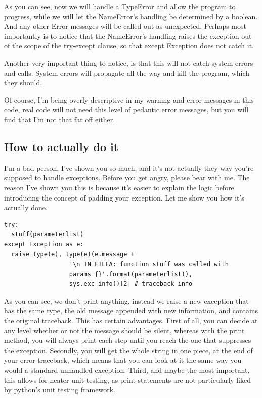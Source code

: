 \documentclass[10pt,a4paper]{article}
\begin{document}
As you can see, now we will handle a TypeError and allow the program to progress, while we will let the NameError's handling be determined by a boolean. And any other Error messages will be called out as unexpected. Perhaps most importantly is to notice that the NameError's handling raises the exception out of the scope of the try-except clause, so that except Exception does not catch it.

Another very important thing to notice, is that this will not catch system errors and calls. System errors will propagate all the way and kill the program, which they should. 

Of course, I'm being overly descriptive in my warning and error messages in this code, real code will not need this level of pedantic error messages, but you will find that I'm not that far off either. 

\subsection{How to actually do it}

I'm a bad person. I've shown you so much, and it's not actually they way you're supposed to handle exceptions. Before you get angry, please bear with me. The reason I've shown you this is because it's easier to explain the logic before introducing the concept of padding your exception. Let me show you how it's actually done.

\begin{lstlisting}
try: 
  stuff(parameterlist)
except Exception as e:
  raise type(e), type(e)(e.message + 
                  '\n IN FILEA: function stuff was called with 
                  params {}'.format(parameterlist)), 
                  sys.exc_info()[2] # traceback info
\end{lstlisting}

As you can see, we don't print anything, instead we raise a new exception that has the same type, the old message appended with new information, and contains the original traceback. This has certain advantages. First of all, you can decide at any level whether or not the message should be silent, whereas with the print method, you will always print each step until you reach the one that suppresses the exception. Secondly, you will get the whole string in one piece, at the end of your error traceback, which means that you can look at it the same way you would a standard unhandled exception. Third, and maybe the most important, this allows for neater unit testing, as print statements are not particularly liked by python's unit testing framework. 
\end{document}
